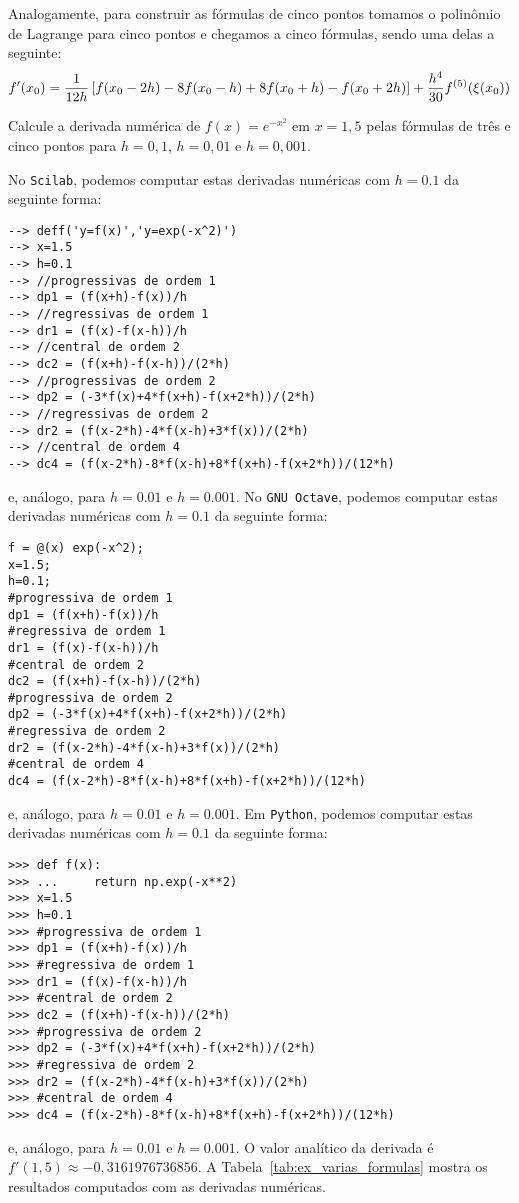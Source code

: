 Analogamente, para construir as fórmulas de cinco pontos tomamos o polinômio de Lagrange para cinco pontos e chegamos a cinco fórmulas, sendo uma delas a seguinte:
\begin{equation}
{\label{cinco_pontos}}f'(x_0)=\frac{1}{12h}\left[f(x_0-2h)-8f(x_0-h)+8f(x_0+h)-f(x_0+2h)\right]+\frac{h^4}{30}f^{(5)}(\xi(x_0))
\end{equation}

\begin{ex}\label{ex:varias_formulas}
Calcule a derivada numérica de $f(x)=e^{-x^2}$ em $x=1,5$ pelas fórmulas de três e cinco pontos para $h=0,1$, $h=0,01$ e $h=0,001$.
\end{ex}
\begin{sol}
\ifisscilab
No \verb+Scilab+, podemos computar estas derivadas numéricas com $h=0.1$ da seguinte forma:
\begin{verbatim}
--> deff('y=f(x)','y=exp(-x^2)')
--> x=1.5
--> h=0.1
--> //progressivas de ordem 1
--> dp1 = (f(x+h)-f(x))/h
--> //regressivas de ordem 1
--> dr1 = (f(x)-f(x-h))/h
--> //central de ordem 2
--> dc2 = (f(x+h)-f(x-h))/(2*h)
--> //progressivas de ordem 2
--> dp2 = (-3*f(x)+4*f(x+h)-f(x+2*h))/(2*h)
--> //regressivas de ordem 2
--> dr2 = (f(x-2*h)-4*f(x-h)+3*f(x))/(2*h)
--> //central de ordem 4
--> dc4 = (f(x-2*h)-8*f(x-h)+8*f(x+h)-f(x+2*h))/(12*h)
\end{verbatim}
e, análogo, para $h=0.01$ e $h=0.001$.
\fi
\ifisoctave
No \verb+GNU Octave+, podemos computar estas derivadas numéricas com $h=0.1$ da seguinte forma:
\begin{verbatim}
f = @(x) exp(-x^2);
x=1.5;
h=0.1;
#progressiva de ordem 1
dp1 = (f(x+h)-f(x))/h
#regressiva de ordem 1
dr1 = (f(x)-f(x-h))/h
#central de ordem 2
dc2 = (f(x+h)-f(x-h))/(2*h)
#progressiva de ordem 2
dp2 = (-3*f(x)+4*f(x+h)-f(x+2*h))/(2*h)
#regressiva de ordem 2
dr2 = (f(x-2*h)-4*f(x-h)+3*f(x))/(2*h)
#central de ordem 4
dc4 = (f(x-2*h)-8*f(x-h)+8*f(x+h)-f(x+2*h))/(12*h)
\end{verbatim}
e, análogo, para $h=0.01$ e $h=0.001$.
\fi
\ifispython
Em \verb+Python+, podemos computar estas derivadas numéricas com $h=0.1$ da seguinte forma:
\begin{verbatim}
>>> def f(x):
>>> ...     return np.exp(-x**2)
>>> x=1.5
>>> h=0.1
>>> #progressiva de ordem 1
>>> dp1 = (f(x+h)-f(x))/h
>>> #regressiva de ordem 1
>>> dr1 = (f(x)-f(x-h))/h
>>> #central de ordem 2
>>> dc2 = (f(x+h)-f(x-h))/(2*h)
>>> #progressiva de ordem 2
>>> dp2 = (-3*f(x)+4*f(x+h)-f(x+2*h))/(2*h)
>>> #regressiva de ordem 2
>>> dr2 = (f(x-2*h)-4*f(x-h)+3*f(x))/(2*h)
>>> #central de ordem 4
>>> dc4 = (f(x-2*h)-8*f(x-h)+8*f(x+h)-f(x+2*h))/(12*h)
\end{verbatim}
e, análogo, para $h=0.01$ e $h=0.001$.
\fi
O valor analítico da derivada é $f'(1,5) \approx -0,3161976736856$. A Tabela~\ref{tab:ex_varias_formulas} mostra os resultados computados com as derivadas numéricas.


\end{sol}
